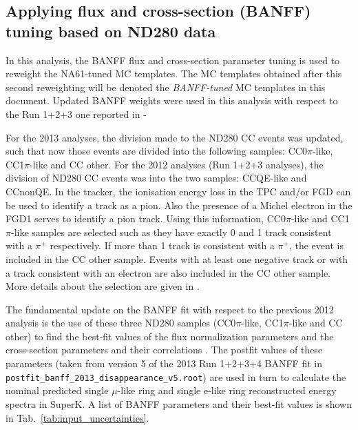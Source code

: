 
\subsection{Applying flux and cross-section (BANFF) tuning based on ND280 data}
\label{sec:prediction:BANFF}

In this analysis, the BANFF flux and cross-section parameter tuning is used to reweight the NA61-tuned MC templates.
The MC templates obtained after this second reweighting will be denoted the {\em BANFF-tuned} MC templates
in this document. Updated BANFF weights were used in this analysis with respect to the Run 1+2+3 one reported in \cite{OurJointAnalysis}-

For the 2013 analyses, the division made to the ND280 CC events was updated, such that now those events are divided 
into the following samples: CC0$\pi$-like, CC1$\pi$-like and CC other. 
For the 2012 analyses (Run 1+2+3 analyses), the division of ND280 CC events was into the two samples: CCQE-like and CCnonQE. 
In the tracker, the ionisation energy loss in the TPC and/or FGD can be used to identify a track as a pion. Also the presence of a Michel electron in the FGD1 serves to identify a pion track. Using this information, CC0$\pi$-like and CC1$\pi$-like samples are selected such as they have exactly 0 and 1 track consistent with a $\pi^{+}$ respectively. If more than 1 track is consistent with a $\pi^{+}$, the event is included in the CC other sample. Events with at least one negative track or with a track consistent with an electron are also included in the CC other sample. More details about the selection are given in \cite{ND280Inputs}.

The fundamental update on the BANFF fit with respect to the previous 2012 analysis is the use of these three ND280 samples
(CC0$\pi$-like, CC1$\pi$-like and CC other) to find the best-fit values of the flux normalization parameters and the cross-section parameters and their correlations \cite{BANFF2013}. The postfit values of these 
parameters (taken from version 5 of the 2013 Run 1+2+3+4 BANFF fit in \verb+postfit_banff_2013_disappearance_v5.root+) are used in
turn to calculate the nominal predicted single $\mu$-like ring and single e-like ring reconstructed energy spectra in SuperK.
A list of BANFF parameters and their best-fit values is shown in Tab.\ \ref{tab:input_uncertainties}.


